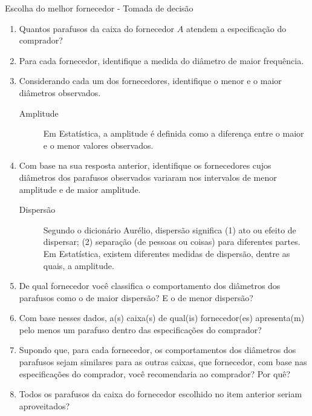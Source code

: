 \begin{task}{Escolha do melhor fornecedor - Tomada de decisão}
\begin{enumerate}
\item {} 
Quantos parafusos da caixa do fornecedor $A$ atendem a especificação do comprador?

\item {} 
Para cada fornecedor, identifique a medida do diâmetro de maior frequência.

\item {} 
Considerando cada um dos fornecedores, identifique o menor e o maior diâmetros observados.

\begin{description}
\item[{Amplitude}] \leavevmode{}\label{est1-def-2}
Em Estatística, a amplitude é definida como a diferença entre o maior e o menor valores observados.
\end{description}

\item {} 
Com base na sua resposta anterior, identifique os fornecedores cujos diâmetros dos parafusos observados variaram nos intervalos de menor amplitude e de maior amplitude.

\begin{description}

\item[{Dispersão}] \leavevmode{}\label{est1-def-3}
Segundo o dicionário Aurélio, dispersão significa (1) ato ou efeito de dispersar; (2) separação (de pessoas ou coisas) para diferentes partes.  Em Estatística, existem diferentes medidas de dispersão, dentre as quais, a amplitude.

\end{description}

\item De qual fornecedor você classifica o comportamento dos diâmetros dos parafusos como o de maior dispersão? E o de menor dispersão?


\item Com base nesses dados, a(s) caixa(s) de qual(is)  fornecedor(es) apresenta(m) pelo menos um parafuso dentro das especificações do comprador?

\item Supondo que, para cada fornecedor, os comportamentos dos diâmetros dos parafusos sejam similares para as outras caixas, que fornecedor, com base nas especificações do comprador, você recomendaria ao comprador? Por quê?

\item Todos os parafusos da caixa do fornecedor escolhido no item anterior seriam aproveitados?
\end{enumerate}

\end{task}

